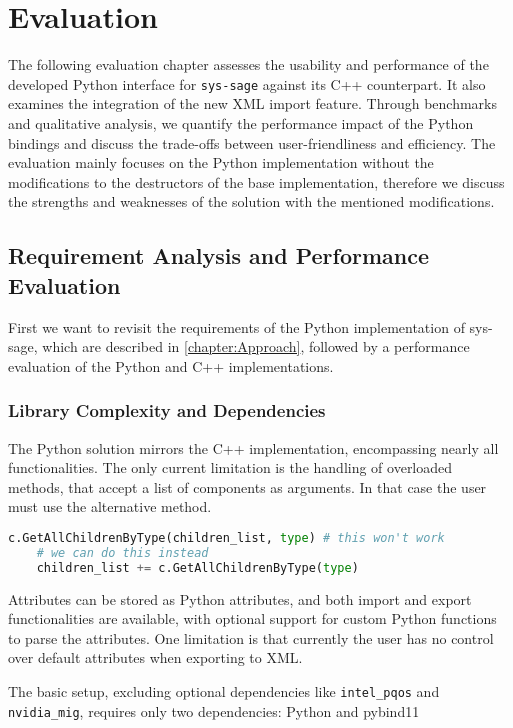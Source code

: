 \chapter{Evaluation}\label{chapter:Evaluation}

The following evaluation chapter assesses the usability and performance of the developed Python interface for \texttt{sys-sage} against its C++ counterpart. It also examines the integration of the new XML import feature. Through benchmarks and qualitative analysis, we quantify the performance impact of the Python bindings and discuss the trade-offs between user-friendliness and efficiency. The evaluation mainly focuses on the Python implementation without the modifications to the destructors of the base implementation, therefore we discuss the strengths and weaknesses of the solution with the mentioned modifications.

\section{Requirement Analysis and Performance Evaluation}
First we want to revisit the requirements of the Python implementation of sys-sage, which are described in \autoref{chapter:Approach}, followed by a performance evaluation of the Python and C++ implementations.
\subsection{Library Complexity and Dependencies}

The Python solution mirrors the C++ implementation, encompassing nearly all functionalities. The only current limitation is the handling of overloaded methods, that accept a list of components as arguments. In that case the user must use the alternative method. 
\begin{lstlisting}[language=Python, xleftmargin=4em, frame = single]
    c.GetAllChildrenByType(children_list, type) # this won't work
    # we can do this instead 
    children_list += c.GetAllChildrenByType(type)
    \end{lstlisting}

Attributes can be stored as Python attributes, and both import and export functionalities are available, with optional support for custom Python functions to parse the attributes. One limitation is that currently the user has no control over default attributes when exporting to XML. 

The basic setup, excluding optional dependencies like \texttt{intel\_pqos} and \texttt{nvidia\_mig}, requires only two dependencies: Python and pybind11

